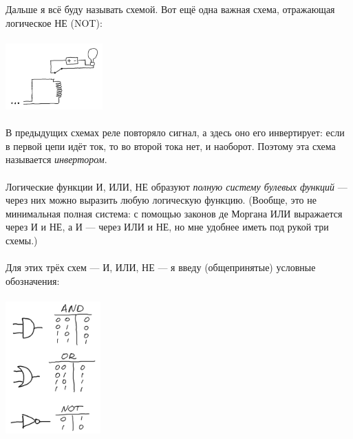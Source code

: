 \documentclass[11pt]{book}
\begin{document}
\\ \\
Дальше я всё буду называть схемой. Вот ещё одна важная схема, отражающая логическое НЕ (NOT):
\\ \\
\includegraphics[height=1in]{pic/17.png}
\\ \\
В предыдущих схемах реле повторяло сигнал, а здесь оно его инвертирует: если в первой цепи идёт ток, то во второй тока нет, и наоборот.
Поэтому эта схема называется \emph{инвертором}.
\\ \\
Логические функции И, ИЛИ, НЕ образуют \emph{полную систему булевых функций} --- через них можно выразить любую логическую функцию.
(Вообще, это не минимальная полная система: с помощью законов де Моргана ИЛИ выражается через И и НЕ, а И --- через ИЛИ и НЕ,
но мне удобнее иметь под рукой три схемы.)
\\ \\
Для этих трёх схем --- И, ИЛИ, НЕ --- я введу (общепринятые) условные обозначения:
\\ \\
\includegraphics[height=2in]{pic/logic_legend.png}
\end{document}
